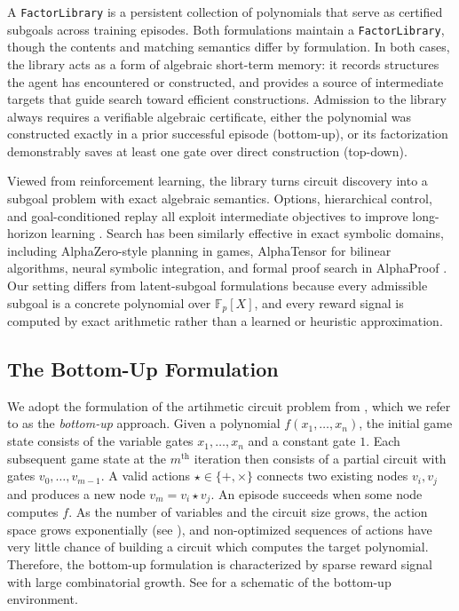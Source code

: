 \documentclass{article}
\theoremstyle{definition}
\theoremstyle{remark}
\begin{document}
A \texttt{FactorLibrary} is a persistent collection of polynomials that serve as certified subgoals across training episodes. Both formulations maintain a \texttt{FactorLibrary}, though the contents and matching semantics differ by formulation. In both cases, the library acts as a form of algebraic short-term memory: it records structures the agent has encountered or constructed, and provides a source of intermediate targets that guide search toward efficient constructions. Admission to the library always requires a verifiable algebraic certificate, either the polynomial was constructed exactly in a prior successful episode (bottom-up), or its factorization demonstrably saves at least one gate over direct construction (top-down).

Viewed from reinforcement learning, the library turns circuit discovery into a subgoal problem with exact algebraic semantics. Options, hierarchical control, and goal-conditioned replay all exploit intermediate objectives to improve long-horizon learning \citep{Sutton1999Options,Vezhnevets2017Feudal,Kulkarni2016HierarchicalDeepRL,Andrychowicz2017HER}. Search has been similarly effective in exact symbolic domains, including AlphaZero-style planning in games, AlphaTensor for bilinear algorithms, neural symbolic integration, and formal proof search in AlphaProof \citep{Silveretal2018AlphaZero,Fawzietal2022AlphaTensor,Lample2020Deep,Hubert2025AlphaProof}. Our setting differs from latent-subgoal formulations because every admissible subgoal is a concrete polynomial over $\mathbb{F}_p[X]$, and every reward signal is computed by exact arithmetic rather than a learned or heuristic approximation.


\subsection{The Bottom-Up Formulation}
\label{subsec:bottom-up}

We adopt the formulation of the artihmetic circuit problem from \citet{Zhang2026CircuitBuilder}, which we refer to as the \textit{bottom-up} approach. Given a polynomial $f(x_1, \dots,x_n)$, the initial game state consists of the variable gates $x_1, \dots, x_n$ and a constant gate $1$. Each subsequent game state at the $m^\text{th}$ iteration then consists of a partial circuit with gates $v_0,\ldots,v_{m-1}$. A valid actions $\star\in\{+,\times\}$ connects two existing nodes $v_i,v_j$ and produces a new node $v_m=v_i\star v_j$. An episode succeeds when some node computes $f$. As the number of variables and the circuit size grows, the action space grows exponentially (see \citet[Section 3.2]{Zhang2026CircuitBuilder}), and non-optimized sequences of actions have very little chance of building a circuit which computes the target polynomial. Therefore, the bottom-up formulation is characterized by sparse reward signal with large combinatorial growth. See  for a schematic of the bottom-up environment. 
\end{document}
